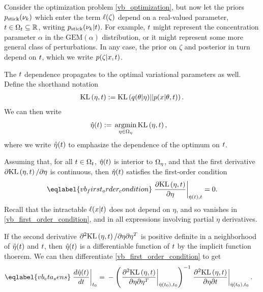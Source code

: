 Consider the optimization problem \eqref{vb_optimization}, but now let the
priors $p_{\mathrm{stick}}(\nu_k)$ which enter the term $\ell(\zeta)$ depend on a
real-valued parameter, $t \in \Omega_{t} \subseteq \mathbb{R}$, writing
$p_{\mathrm{stick}}(\nu_k \vert t)$.  For example, $t$ might represent the concentration
parameter $\alpha$ in the $\mathrm{GEM}(\alpha)$ distribution, or it might
represent some more general class of perturbations.  In any case, the prior on
$\zeta$ and posterior in turn depend on $t$, which we write $p(\zeta \vert x,
t)$.

The $t$ dependence propagates to the optimal
variational parameters as well.  Define the shorthand notation
%
\begin{align*}
%
\KL{\eta, \t} := \KL{\q(\theta \vert \eta) || p(\x \vert \theta, \t)}.
%
\end{align*}
%
We can then write
%
\begin{align*}
%
\etaopt(\t) :={}& \argmin_{\eta \in \etadom} \KL{\eta, \t},
%
\end{align*}
%
where we write $\hat\eta(t)$ to emphasize the dependence of the optimum on $t$.

Assuming that, for all $t \in \Omega_{t}$, $\hat\eta(t)$ is interior to $\Omega_{\eta}$,
and that the first derivative $\partial \mathrm{KL}\left(\eta, t\right)/ \partial \eta$ is
continuous, then $\hat\eta(t)$ satisfies the first-order condition
%
\begin{align}\eqlabel{vb_first_order_condition}
%
\fracat{\partial \KL{\eta, \t}}{ \partial \eta}{\etaopt(\t), \t} = 0.
%
\end{align}
%
Recall that the intractable $\ell(x \vert t)$ does not depend on
$\eta$, and so vanishes in \eqref{vb_first_order_condition}, and in all
expressions involving partial $\eta$ derivatives.

If the second derivative $\partial^2 \mathrm{KL}\left(\eta, t\right)/ \partial \eta \partial
\eta^T$ is positive definite in a neighborhood of $\hat\eta(t)$ and $t$, then
$\hat\eta(t)$ is a differentiable function of $t$ by the implicit function
thoerem.  We can then differentiate \eqref{vb_first_order_condition} to get
%
\begin{align}\eqlabel{vb_eta_sens}
%
\fracat{d \etaopt(\t)}{d \t}{\t_0} ={}&
    - \left( \fracat{\partial^2 \KL{\eta, \t}}
                    {\partial \eta \partial \eta^T}
                    {\etaopt(\t_0), \t_0} \right)^{-1}
    \fracat{\partial^2 \KL{\eta, \t}}
           {\partial \eta \partial \t}
           {\etaopt(\t_0), \t_0}.
%
\end{align}

